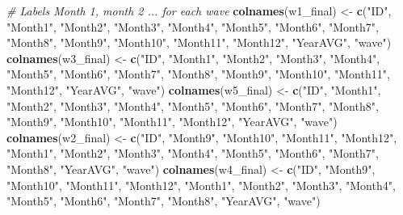 \documentclass[
]{book}
\newenvironment{Shaded}{\begin{snugshade}}{\end{snugshade}}
\newcommand{\CommentTok}[1]{\textcolor[rgb]{0.56,0.35,0.01}{\textit{#1}}}
\newcommand{\KeywordTok}[1]{\textcolor[rgb]{0.13,0.29,0.53}{\textbf{#1}}}
\newcommand{\NormalTok}[1]{#1}
\newcommand{\StringTok}[1]{\textcolor[rgb]{0.31,0.60,0.02}{#1}}
\begin{document}
\begin{Shaded}
\begin{Highlighting}[]
\CommentTok{# Labels Month 1, month 2 ... for each wave}
\KeywordTok{colnames}\NormalTok{(w1_final) <-}\StringTok{ }\KeywordTok{c}\NormalTok{(}\StringTok{"ID"}\NormalTok{, }\StringTok{"Month1"}\NormalTok{, }\StringTok{"Month2"}\NormalTok{, }\StringTok{"Month3"}\NormalTok{, }\StringTok{"Month4"}\NormalTok{, }\StringTok{"Month5"}\NormalTok{, }\StringTok{"Month6"}\NormalTok{, }\StringTok{"Month7"}\NormalTok{, }\StringTok{"Month8"}\NormalTok{, }\StringTok{"Month9"}\NormalTok{, }\StringTok{"Month10"}\NormalTok{, }\StringTok{"Month11"}\NormalTok{, }\StringTok{"Month12"}\NormalTok{, }\StringTok{"YearAVG"}\NormalTok{, }\StringTok{"wave"}\NormalTok{)}
\KeywordTok{colnames}\NormalTok{(w3_final) <-}\StringTok{ }\KeywordTok{c}\NormalTok{(}\StringTok{"ID"}\NormalTok{, }\StringTok{"Month1"}\NormalTok{, }\StringTok{"Month2"}\NormalTok{, }\StringTok{"Month3"}\NormalTok{, }\StringTok{"Month4"}\NormalTok{, }\StringTok{"Month5"}\NormalTok{, }\StringTok{"Month6"}\NormalTok{, }\StringTok{"Month7"}\NormalTok{, }\StringTok{"Month8"}\NormalTok{, }\StringTok{"Month9"}\NormalTok{, }\StringTok{"Month10"}\NormalTok{, }\StringTok{"Month11"}\NormalTok{, }\StringTok{"Month12"}\NormalTok{, }\StringTok{"YearAVG"}\NormalTok{, }\StringTok{"wave"}\NormalTok{)}
\KeywordTok{colnames}\NormalTok{(w5_final) <-}\StringTok{ }\KeywordTok{c}\NormalTok{(}\StringTok{"ID"}\NormalTok{, }\StringTok{"Month1"}\NormalTok{, }\StringTok{"Month2"}\NormalTok{, }\StringTok{"Month3"}\NormalTok{, }\StringTok{"Month4"}\NormalTok{, }\StringTok{"Month5"}\NormalTok{, }\StringTok{"Month6"}\NormalTok{, }\StringTok{"Month7"}\NormalTok{, }\StringTok{"Month8"}\NormalTok{, }\StringTok{"Month9"}\NormalTok{, }\StringTok{"Month10"}\NormalTok{, }\StringTok{"Month11"}\NormalTok{, }\StringTok{"Month12"}\NormalTok{, }\StringTok{"YearAVG"}\NormalTok{, }\StringTok{"wave"}\NormalTok{)}
\KeywordTok{colnames}\NormalTok{(w2_final) <-}\StringTok{ }\KeywordTok{c}\NormalTok{(}\StringTok{"ID"}\NormalTok{, }\StringTok{"Month9"}\NormalTok{, }\StringTok{"Month10"}\NormalTok{, }\StringTok{"Month11"}\NormalTok{, }\StringTok{"Month12"}\NormalTok{, }\StringTok{"Month1"}\NormalTok{, }\StringTok{"Month2"}\NormalTok{, }\StringTok{"Month3"}\NormalTok{, }\StringTok{"Month4"}\NormalTok{, }\StringTok{"Month5"}\NormalTok{, }\StringTok{"Month6"}\NormalTok{, }\StringTok{"Month7"}\NormalTok{, }\StringTok{"Month8"}\NormalTok{, }\StringTok{"YearAVG"}\NormalTok{, }\StringTok{"wave"}\NormalTok{)}
\KeywordTok{colnames}\NormalTok{(w4_final) <-}\StringTok{ }\KeywordTok{c}\NormalTok{(}\StringTok{"ID"}\NormalTok{, }\StringTok{"Month9"}\NormalTok{, }\StringTok{"Month10"}\NormalTok{, }\StringTok{"Month11"}\NormalTok{, }\StringTok{"Month12"}\NormalTok{, }\StringTok{"Month1"}\NormalTok{, }\StringTok{"Month2"}\NormalTok{, }\StringTok{"Month3"}\NormalTok{, }\StringTok{"Month4"}\NormalTok{, }\StringTok{"Month5"}\NormalTok{, }\StringTok{"Month6"}\NormalTok{, }\StringTok{"Month7"}\NormalTok{, }\StringTok{"Month8"}\NormalTok{, }\StringTok{"YearAVG"}\NormalTok{, }\StringTok{"wave"}\NormalTok{)}

\end{Highlighting}
\end{Shaded}
\end{document}
